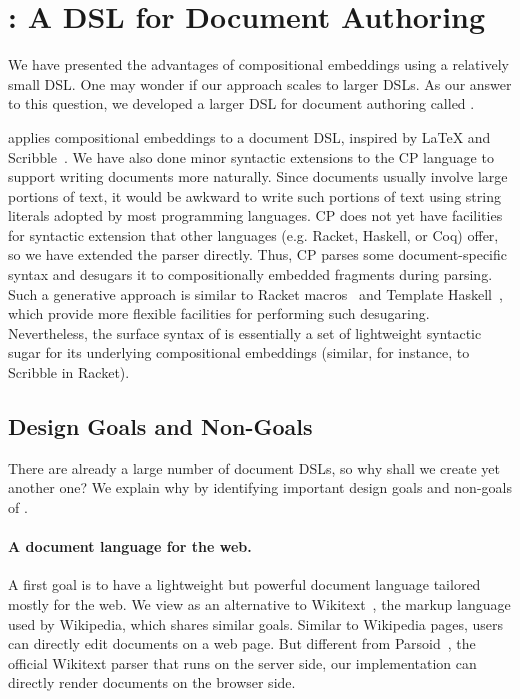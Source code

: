 \section{\ExT: A DSL for Document Authoring} \label{sec:dsl}

We have presented the advantages of compositional embeddings using a relatively
small DSL. One may wonder if our approach scales to larger DSLs. As our answer
to this question, we developed a larger DSL for document authoring called \ExT.

\ExT applies compositional embeddings to a document DSL, inspired by \LaTeX{}
and Scribble~\citep{flatt2009scribble}. We have also done minor syntactic
extensions to the CP language to support writing documents more naturally. Since
documents usually involve large portions of text, it would be awkward to write
such portions of text using string literals adopted by most programming
languages. CP does not yet have facilities for syntactic extension that other
languages (e.g. Racket, Haskell, or Coq) offer, so we have extended the parser
directly. Thus, CP parses some document-specific syntax and desugars it to
compositionally embedded fragments during parsing. Such a generative approach is
similar to Racket macros~\citep{ballantyne2020macros} and Template
Haskell~\citep{sheard2002template}, which provide more flexible facilities for
performing such desugaring. Nevertheless, the surface syntax of \ExT is
essentially a set of lightweight syntactic sugar for its underlying
compositional embeddings (similar, for instance, to Scribble in Racket).

\subsection{Design Goals and Non-Goals} \label{sec:goals}

There are already a large number of document DSLs, so why shall we create yet
another one? We explain why by identifying important design goals and non-goals
of \ExT.

\paragraph{A document language for the web.}
A first goal is to have a lightweight but powerful document language tailored
mostly for the web. We view \ExT as an alternative to Wikitext~\citep{wikitext},
the markup language used by Wikipedia, which shares similar goals. Similar to
Wikipedia pages, users can directly edit \ExT documents on a web page. But
different from Parsoid~\citep{parsoid}, the official Wikitext parser that runs
on the server side, our implementation can directly render documents on the
browser side.

